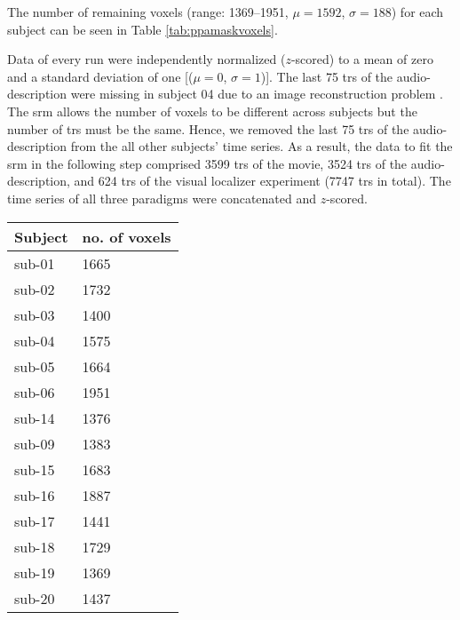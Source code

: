 %
The number of remaining voxels (range: 1369--1951, $\mu=1592$, $\sigma=188$) for
each subject can be seen in Table \ref{tab:ppamaskvoxels}.



Data of every run were independently normalized ($z$-scored) to a mean of zero
and a standard deviation of one [($\mu=0$, $\sigma=1$)].
%
The last 75 \acp{tr} of the audio-description were missing in subject 04 due to
an image reconstruction problem \citep[s.][]{hanke2014audiomovie}.
%
The \ac{srm} allows the number of voxels to be different across subjects but the
number of \acp{tr} must be the same.
%
Hence, we removed the last 75 \acp{tr} of the audio-description from the all
other subjects' time series.
As a result, the data to fit the \ac{srm} in the following step comprised 3599
\acp{tr} of the movie, 3524 \acp{tr} of the audio-description, and 624 \acp{tr}
of the visual localizer experiment (7747 \acp{tr} in total).
The time series of all three paradigms were concatenated and $z$-scored.



\begin{table*}[btp]
    \caption{
    \textbf{Table heading.}
    Number of remaining voxels after time series data of each paradigm
    and subject were masked with the union of individual \acp{ppa} that was
    warped from MNI space into each individual's subjects-space and the
    subject-specific field of view of audio-description.}

\label{tab:ppamaskvoxels}
\begin{tabular}{ll}
    \toprule
    \textbf{Subject} & \textbf{no. of voxels} \\
    \midrule
    sub-01 & 1665 \tabularnewline
    sub-02 & 1732 \tabularnewline
    sub-03 & 1400 \tabularnewline
    sub-04 & 1575 \tabularnewline
    sub-05 & 1664 \tabularnewline
    sub-06 & 1951 \tabularnewline
    sub-14 & 1376 \tabularnewline
    sub-09 & 1383 \tabularnewline
    sub-15 & 1683 \tabularnewline
    sub-16 & 1887 \tabularnewline
    sub-17 & 1441 \tabularnewline
    sub-18 & 1729 \tabularnewline
    sub-19 & 1369 \tabularnewline
    sub-20 & 1437 \tabularnewline
    \bottomrule
\end{tabular}
\caption*{The legend text goes here.}
\end{table*}


